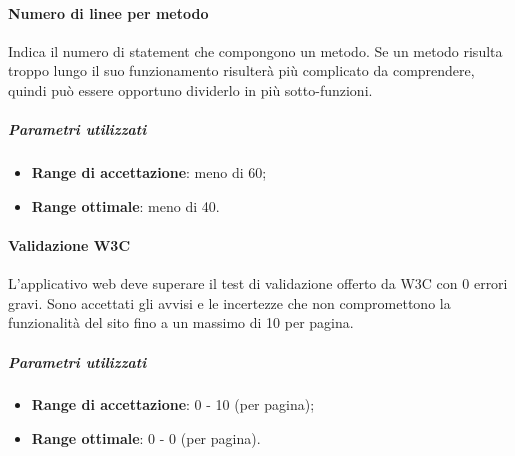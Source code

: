 \documentclass[../PianoDiQualifica.tex]{subfiles}
\begin{document}
					\paragraph{Numero di linee per metodo}
					Indica il numero di statement che compongono un metodo. Se un metodo risulta troppo lungo il suo funzionamento risulterà più complicato da comprendere, quindi può essere opportuno dividerlo in più sotto-funzioni.
					\subparagraph{Parametri utilizzati}
					\begin{itemize}
						\item \textbf{Range di accettazione}: meno di 60;
						\item \textbf{Range ottimale}: meno di 40.
					\end{itemize}
					
					\paragraph{Validazione W3C}
					L'applicativo web deve superare il test di validazione offerto da W3C con 0 errori gravi.
					Sono accettati gli avvisi e le incertezze che non compromettono la funzionalità del sito fino a un massimo di 10 per pagina.
					\subparagraph{Parametri utilizzati}
					\begin{itemize}
						\item \textbf{Range di accettazione}: 0 - 10 (per pagina);
						\item \textbf{Range ottimale}: 0 - 0 (per pagina).
					\end{itemize}	
						
\end{document}
